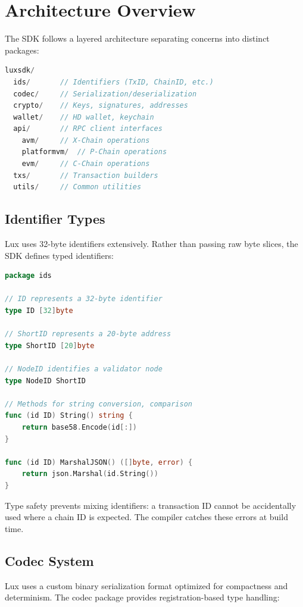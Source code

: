 \documentclass[11pt,twocolumn]{article}
\begin{document}
\section{Architecture Overview}

The SDK follows a layered architecture separating concerns into distinct packages:

\begin{lstlisting}[language=Go,caption=Package Structure]
luxsdk/
  ids/       // Identifiers (TxID, ChainID, etc.)
  codec/     // Serialization/deserialization
  crypto/    // Keys, signatures, addresses
  wallet/    // HD wallet, keychain
  api/       // RPC client interfaces
    avm/     // X-Chain operations
    platformvm/  // P-Chain operations
    evm/     // C-Chain operations
  txs/       // Transaction builders
  utils/     // Common utilities
\end{lstlisting}

\subsection{Identifier Types}

Lux uses 32-byte identifiers extensively. Rather than passing raw byte slices, the SDK defines typed identifiers:

\begin{lstlisting}[language=Go,caption=Typed Identifiers]
package ids

// ID represents a 32-byte identifier
type ID [32]byte

// ShortID represents a 20-byte address
type ShortID [20]byte

// NodeID identifies a validator node
type NodeID ShortID

// Methods for string conversion, comparison
func (id ID) String() string {
    return base58.Encode(id[:])
}

func (id ID) MarshalJSON() ([]byte, error) {
    return json.Marshal(id.String())
}
\end{lstlisting}

Type safety prevents mixing identifiers: a transaction ID cannot be accidentally used where a chain ID is expected. The compiler catches these errors at build time.

\subsection{Codec System}

Lux uses a custom binary serialization format optimized for compactness and determinism. The codec package provides registration-based type handling:
\end{document}
